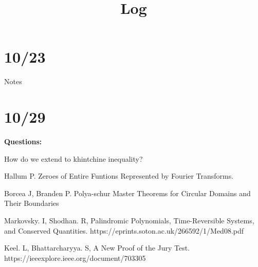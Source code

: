 \documentclass[10pt]{article}
\title{\vspace{-3em}Log}
\newcommand{\1}{\textbf{1}}
\theoremstyle{remark}
\theoremstyle{definition}
\theoremstyle{prop}
\theoremstyle{Corollary}
\begin{document}
\section{10/23}

Notes

\section{10/29}

\textbf{Questions:}

How do we extend to khintchine inequality?



\begin{thebibliography}{9}

 Hallum P. Zeroes of Entire Funtions Represented by Fourier Transforms. 

 Borcea J, Branden P. Polya-schur Master Theorems for Circular Domains and Their Boundaries


 Markovsky. I, Shodhan. R,
Palindromic Polynomials, Time-Reversible Systems, and Conserved Quantities. https://eprints.soton.ac.uk/266592/1/Med08.pdf

 Keel. L, Bhattarcharyya. S,
A New Proof of the Jury Test. https://ieeexplore.ieee.org/document/703305



\end{thebibliography}
\end{document}
